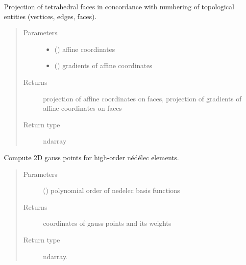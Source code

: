 \documentclass[letterpaper,10pt,english]{sphinxmanual}
\begin{document}
\begin{fulllineitems}
\label{\detokenize{petgem/hvfem:petgem.hvfem.ProjectTetF}}
Projection of tetrahedral faces in concordance with numbering of topological entities (vertices, edges, faces).
\begin{quote}\begin{description}
\item[{Parameters}] \leavevmode\begin{itemize}
\item {} 
 () \textendash{} affine coordinates

\item {} 
 () \textendash{} gradients of affine coordinates

\end{itemize}

\item[{Returns}] \leavevmode
projection of affine coordinates on faces, projection of gradients of affine coordinates on faces

\item[{Return type}] \leavevmode
ndarray

\end{description}\end{quote}

\end{fulllineitems}


\begin{fulllineitems}
\label{\detokenize{petgem/hvfem:petgem.hvfem.compute2DGaussPoints}}
Compute 2D gauss points for high-order nédélec elements.
\begin{quote}\begin{description}
\item[{Parameters}] \leavevmode
{} () \textendash{} polynomial order of nedelec basis functions

\item[{Returns}] \leavevmode
coordinates of gauss points and its weights

\item[{Return type}] \leavevmode
ndarray.

\end{description}\end{quote}

\end{fulllineitems}
\end{document}

